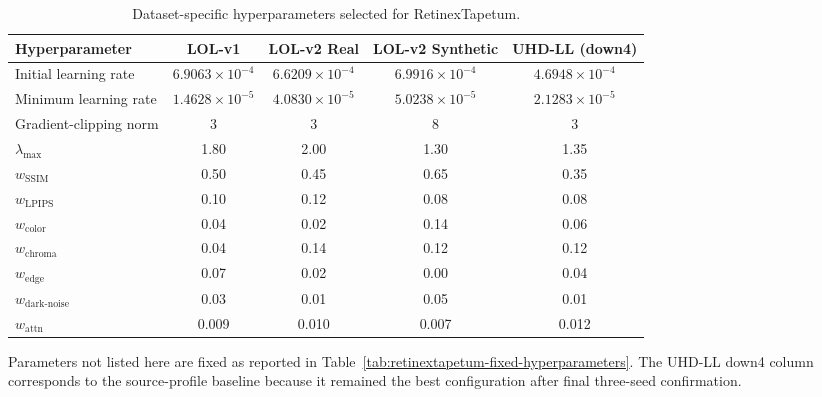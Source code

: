 \begin{table}[t]
  \centering
  \caption{Dataset-specific hyperparameters selected for RetinexTapetum.}
  \label{tab:retinextapetum-hyperparameters}
  \small
  \begin{threeparttable}
    \begin{adjustbox}{max width=\textwidth}
      \begin{tabular}{lcccc}
        \toprule
        Hyperparameter
          & LOL-v1
          & LOL-v2 Real
          & LOL-v2 Synthetic
          & UHD-LL (down4) \\
        \midrule
        Initial learning rate
          & $6.9063\!\times\!10^{-4}$
          & $6.6209\!\times\!10^{-4}$
          & $6.9916\!\times\!10^{-4}$
          & $4.6948\!\times\!10^{-4}$ \\
        Minimum learning rate
          & $1.4628\!\times\!10^{-5}$
          & $4.0830\!\times\!10^{-5}$
          & $5.0238\!\times\!10^{-5}$
          & $2.1283\!\times\!10^{-5}$ \\
        Gradient-clipping norm
          & 3 & 3 & 8 & 3 \\
        $\lambda_{\max}$
          & 1.80 & 2.00 & 1.30 & 1.35 \\
        $w_{\mathrm{SSIM}}$
          & 0.50 & 0.45 & 0.65 & 0.35 \\
        $w_{\mathrm{LPIPS}}$
          & 0.10 & 0.12 & 0.08 & 0.08 \\
        $w_{\mathrm{color}}$
          & 0.04 & 0.02 & 0.14 & 0.06 \\
        $w_{\mathrm{chroma}}$
          & 0.04 & 0.14 & 0.12 & 0.12 \\
        $w_{\mathrm{edge}}$
          & 0.07 & 0.02 & 0.00 & 0.04 \\
        $w_{\mathrm{dark\text{-}noise}}$
          & 0.03 & 0.01 & 0.05 & 0.01 \\
        $w_{\mathrm{attn}}$
          & 0.009 & 0.010 & 0.007 & 0.012 \\
        \bottomrule
      \end{tabular}
    \end{adjustbox}
    \begin{tablenotes}[flushleft]
      \footnotesize
      \item Parameters not listed here are fixed as reported in
      Table~\ref{tab:retinextapetum-fixed-hyperparameters}. The UHD-LL down4
      column corresponds to the source-profile baseline because it remained the
      best configuration after final three-seed confirmation.
    \end{tablenotes}
  \end{threeparttable}
\end{table}

